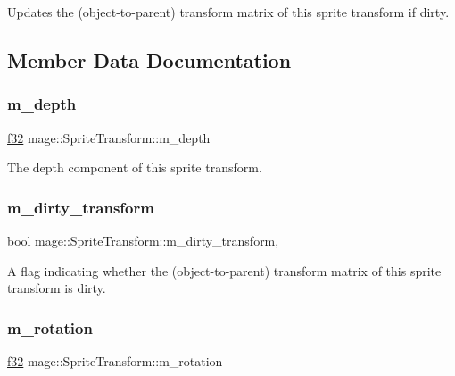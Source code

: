 Updates the (object-\/to-\/parent) transform matrix of this sprite transform if dirty. 

\subsection{Member Data Documentation}
\hypertarget{structmage_1_1_sprite_transform_a4a867b6d401866cbd50d128aa5793fa9}{}\label{structmage_1_1_sprite_transform_a4a867b6d401866cbd50d128aa5793fa9} 
\subsubsection{\texorpdfstring{m\+\_\+depth}{m\_depth}}
{\footnotesize\ttfamily \hyperlink{namespacemage_a6a44ad388483959dc4dff9f2aef91431}{f32} mage\+::\+Sprite\+Transform\+::m\+\_\+depth\hspace{0.3cm}{\ttfamily [private]}}

The depth component of this sprite transform. \hypertarget{structmage_1_1_sprite_transform_a3072ed606f16d14d16cdad46438e9cf3}{}\label{structmage_1_1_sprite_transform_a3072ed606f16d14d16cdad46438e9cf3} 
\subsubsection{\texorpdfstring{m\+\_\+dirty\+\_\+transform}{m\_dirty\_transform}}
{\footnotesize\ttfamily bool mage\+::\+Sprite\+Transform\+::m\+\_\+dirty\+\_\+transform\hspace{0.3cm}{\ttfamily [mutable]}, {\ttfamily [private]}}

A flag indicating whether the (object-\/to-\/parent) transform matrix of this sprite transform is dirty. \hypertarget{structmage_1_1_sprite_transform_a8cf752602713cc7c9d98325767cb153d}{}\label{structmage_1_1_sprite_transform_a8cf752602713cc7c9d98325767cb153d} 
\subsubsection{\texorpdfstring{m\+\_\+rotation}{m\_rotation}}
{\footnotesize\ttfamily \hyperlink{namespacemage_a6a44ad388483959dc4dff9f2aef91431}{f32} mage\+::\+Sprite\+Transform\+::m\+\_\+rotation\hspace{0.3cm}{\ttfamily [private]}}

